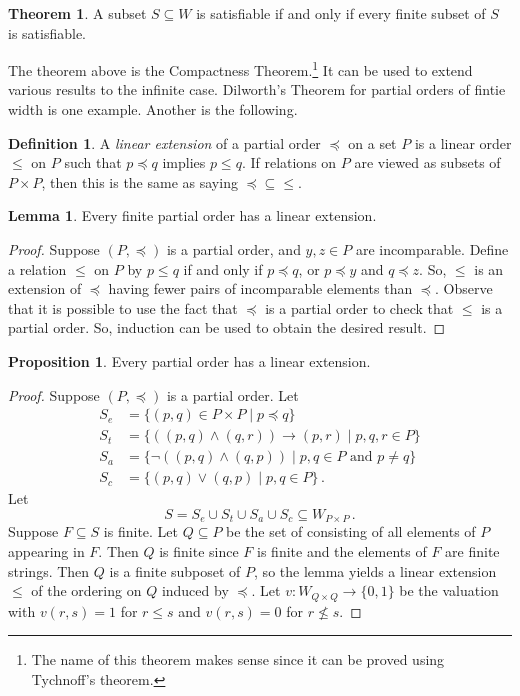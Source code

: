 \documentclass[12pt]{article}
\theoremstyle{definition}
\newtheorem*{definition}{\color{OliveGreen} Definition}
\newtheorem*{proposition}{\color{blue} Proposition}
\newtheorem*{lemma}{\color{blue} Lemma}
\newtheorem*{theorem}{\color{blue} Theorem}
\begin{document}
\begin{multicols*}{2}
\begin{theorem}
	A subset $S\subseteq W$ is satisfiable if and only if every finite subset of $S$ is satisfiable.
\end{theorem}
The theorem above is the Compactness Theorem.\footnote{The name of this theorem makes sense since it can be proved using Tychnoff's theorem.} It can be used to extend various results to the infinite case. Dilworth's Theorem for partial orders of fintie width is one example. Another is the following.
\begin{definition}
	A \emph{linear extension} of a partial order $\preceq$ on a set $P$ is a linear order $\leq$ on $P$ such that $p\preceq q$ implies $p\leq q$. If relations on $P$ are viewed as subsets of $P\times P$, then this is the same as saying $\preceq\subseteq\leq$.
\end{definition}
\begin{lemma}
	Every finite partial order has a linear extension.
\end{lemma}
\begin{proof}
	Suppose $(P,\preceq)$ is a partial order, and $y,z\in P$ are incomparable. Define a relation $\leq$ on $P$ by $p\leq q$ if and only if $p\preceq q$, or $p\preceq y$ and $q\preceq z$. So, $\leq$ is an extension of $\preceq$ having fewer pairs of incomparable elements than $\preceq$. Observe that it is possible to use the fact that $\preceq$ is a partial order to check that $\leq$ is a partial order. So, induction can be used to obtain the desired result.
\end{proof}
\begin{proposition}
	Every partial order has a linear extension.
\end{proposition}
\begin{proof}
	Suppose $(P, \preceq)$ is a partial order. Let
	\begin{align*}
		S_e &= \{(p,q)\in P\times P \mid p\preceq q\} \\
		S_t &= \{((p,q)\land(q,r))\rightarrow(p,r) \mid p,q,r\in P\} \\
		S_a &= \{\neg((p,q)\land(q,p)) \mid p,q\in P\text{ and }p\neq q\} \\
		S_c &= \{(p,q)\lor(q,p) \mid p,q\in P\}\,.
	\end{align*}
	Let
	\[
	S = S_e\cup S_t\cup S_a\cup S_c \subseteq W_{P\times P}\,.
	\]
	Suppose $F\subseteq S$ is finite. Let $Q\subseteq P$ be the set of consisting of all elements of $P$ appearing in $F$. Then $Q$ is finite since $F$ is finite and the elements of $F$ are finite strings. Then $Q$ is a finite subposet of $P$, so the lemma yields a linear extension $\leq$ of the ordering on $Q$ induced by $\preceq$. Let $v: W_{Q\times Q}\rightarrow\{0,1\}$ be the valuation with $v(r,s)=1$ for $r\leq s$ and $v(r,s)=0$ for $r\not\leq s$.
	

\end{proof}
\end{multicols*}
\end{document}
